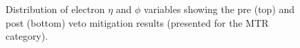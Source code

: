 \begin{figure}[htbp]
{    }
  \caption{Distribution of electron $\eta$ and $\phi$ variables showing the pre (top) and post (bottom) veto mitigation results (presented for the MTR category).}
  \label{fig:2018_Wenu_HEM}
\end{figure}





